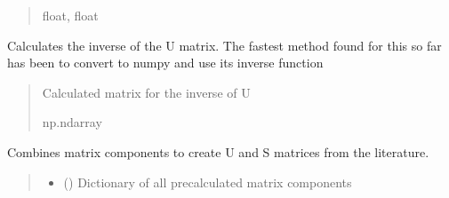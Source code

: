 \documentclass[letterpaper,10pt,english]{sphinxmanual}
\begin{document}
\begin{fulllineitems}
\begin{fulllineitems}
\begin{quote}
\begin{description}
\sphinxAtStartPar
float, float

\end{description}\end{quote}

\end{fulllineitems}


\begin{fulllineitems}
\label{\detokenize{src.sensitivity.faster_sensitivity:src.sensitivity.faster_sensitivity.SensitivityMatrix.invert_U}}
\pysigstartsignatures
\pysiglinewithargsret
{}
{}
{}
\pysigstopsignatures
\sphinxAtStartPar
Calculates the inverse of the U matrix.
The fastest method found for this so far has been to convert to numpy and use its inverse function
\begin{quote}\begin{description}
\sphinxAtStartPar
Calculated matrix for the inverse of U

\sphinxAtStartPar
np.ndarray

\end{description}\end{quote}

\end{fulllineitems}


\begin{fulllineitems}
\label{\detokenize{src.sensitivity.faster_sensitivity:src.sensitivity.faster_sensitivity.SensitivityMatrix.matrix_assembly}}
\pysigstartsignatures
\pysiglinewithargsret
{}
{\sphinxparamcomma {}}
{}
\pysigstopsignatures
\sphinxAtStartPar
Combines matrix components to create U and S matrices from the literature.
\begin{quote}\begin{description}
\begin{itemize}
\item {} 
\sphinxAtStartPar
{} () \textendash{} Dictionary of all precalculated matrix components


\end{itemize}
\end{description}
\end{quote}
\end{fulllineitems}
\end{fulllineitems}
\end{document}
